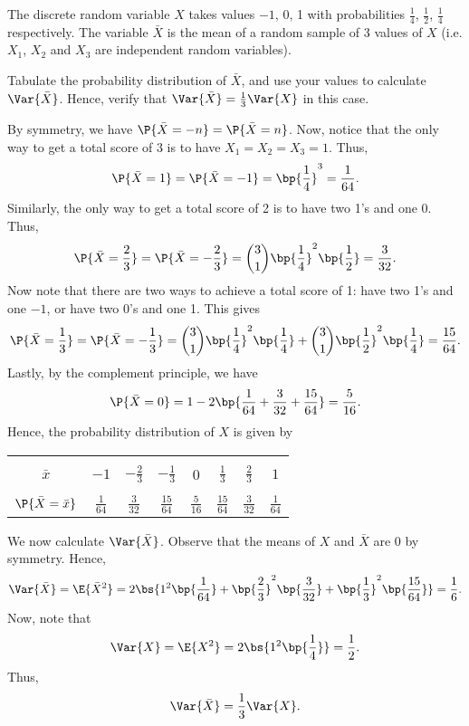 \begin{problem}
    The discrete random variable $X$ takes values $-1$, 0, 1 with probabilities $\frac14$, $\frac12$, $\frac14$ respectively. The variable $\bar{X}$ is the mean of a random sample of 3 values of $X$ (i.e. $X_1$, $X_2$ and $X_3$ are independent random variables).

    Tabulate the probability distribution of $\bar{X}$, and use your values to calculate $\Var{\bar{X}}$. Hence, verify that $\Var{\bar{X}} = \frac13 \Var{X}$ in this case.
\end{problem}
\begin{solution}
    By symmetry, we have $\P{\bar{X} = -n} = \P{\bar{X} = n}$. Now, notice that the only way to get a total score of 3 is to have $X_1 = X_2 = X_3 = 1$. Thus, \[\P{\bar{X} = 1} = \P{\bar{X} = -1} = \bp{\frac14}^3 = \frac1{64}.\] Similarly, the only way to get a total score of 2 is to have two 1's and one 0. Thus, \[\P{\bar{X} = \frac23} = \P{\bar{X} = -\frac23} = \binom31 \bp{\frac14}^2 \bp{\frac12} = \frac3{32}.\] Now note that there are two ways to achieve a total score of 1: have two 1's and one $-1$, or have two 0's and one 1. This gives \[\P{\bar{X} = \frac13} = \P{\bar{X} = -\frac13} = \binom31 \bp{\frac14}^2 \bp{\frac14} + \binom31 \bp{\frac12}^2 \bp{\frac14} = \frac{15}{64}.\] Lastly, by the complement principle, we have \[\P{\bar{X} = 0} = 1 - 2\bp{\frac1{64} + \frac3{32} + \frac{15}{64}} = \frac5{16}.\] Hence, the probability distribution of $X$ is given by
    \begin{table}[H]
        \centering
        \begin{tabular}{|c|c|c|c|c|c|c|c|}
        \hline
        &&&&&&&\\[-1em]
        $\bar{x}$ & $-1$ & $-\frac23$ & $-\frac13$ & 0 & $\frac13$ & $\frac23$ & $1$ \\[0.2em] \hline
        &&&&&&&\\[-1em]
        $\P{\bar{X} = \bar{x}}$ & $\frac1{64}$ & $\frac3{32}$ & $\frac{15}{64}$ & $\frac5{16}$ & $\frac{15}{64}$ & $\frac{3}{32}$ & $\frac1{64}$ \\[0.2em] \hline
        \end{tabular}
    \end{table}
    
    We now calculate $\Var{\bar{X}}$. Observe that the means of $X$ and $\bar{X}$ are 0 by symmetry. Hence, \[\Var{\bar{X}} = \E{\bar{X}^2} = 2\bs{1^2\bp{\frac1{64}} + \bp{\frac23}^2 \bp{\frac3{32}} + \bp{\frac13}^2\bp{\frac{15}{64}}} = \frac16.\] Now, note that \[\Var{X} = \E{X^2} = 2\bs{1^2 \bp{\frac14}} = \frac12.\] Thus, \[\Var{\bar{X}} = \frac13 \Var{X}.\]
\end{solution}

